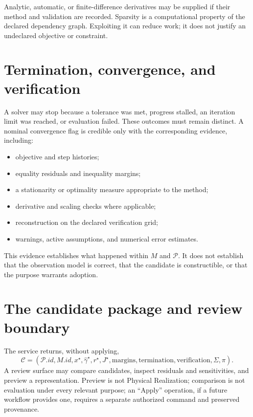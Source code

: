 Analytic, automatic, or finite-difference derivatives may be supplied if their
method and validation are recorded. Sparsity is a computational property of
the declared dependency graph. Exploiting it can reduce work; it does not
justify an undeclared objective or constraint.

\section{Termination, convergence, and verification}

A solver may stop because a tolerance was met, progress stalled, an iteration
limit was reached, or evaluation failed. These outcomes must remain distinct.
A nominal convergence flag is credible only with the corresponding evidence,
including:
\begin{itemize}
\item objective and step histories;
\item equality residuals and inequality margins;
\item a stationarity or optimality measure appropriate to the method;
\item derivative and scaling checks where applicable;
\item reconstruction on the declared verification grid;
\item warnings, active assumptions, and numerical error estimates.
\end{itemize}

This evidence establishes what happened within \(M\) and \(\mathcal P\). It
does not establish that the observation model is correct, that the candidate
is constructible, or that the purpose warrants adoption.

\section{The candidate package and review boundary}

The service returns, without applying,
\[
\mathcal C=
(\mathcal P.id,M.id,x^\star,\widehat\gamma^\star,
r^\star,J^\star,\text{margins},\text{termination},
\text{verification},\Sigma,\pi).
\]
A review surface may compare candidates, inspect residuals and sensitivities,
and preview a representation. Preview is not Physical Realization; comparison
is not evaluation under every relevant purpose; an ``Apply'' operation, if a
future workflow provides one, requires a separate authorized command and
preserved provenance.

